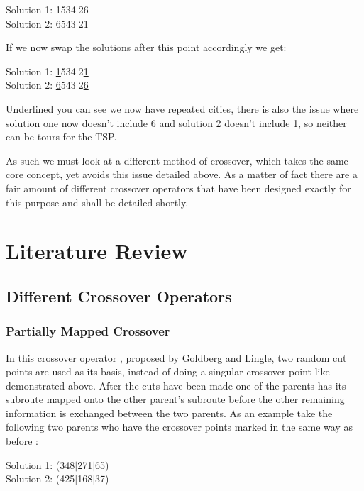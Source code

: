 \documentclass[11pt,a4paper,titlepage]{article}
\begin{document}
\begin{center}\Large
Solution 1: 1534$|$26\\
Solution 2: 6543$|$21
\end{center}

If we now swap the solutions after this point accordingly we get:

\begin{center}\Large
Solution 1: \underline{1}534$|$2\underline{1}\\
Solution 2: \underline{6}543$|$2\underline{6}
\end{center}

Underlined you can see we now have repeated cities, there is also the issue where solution one now doesn't include 6 and solution 2 doesn't include 1, so neither can be tours for the TSP.

As such we must look at a different method of crossover, which takes the same core concept, yet avoids this issue detailed above. As a matter of fact there are a fair amount of different crossover operators that have been designed exactly for this purpose and shall be detailed shortly.

\section{Literature Review}

\subsection{Different Crossover Operators}

\subsubsection{Partially Mapped Crossover}

In this crossover operator \cite{GACrossover}, proposed by Goldberg and Lingle, two random cut points are used as its basis, instead of doing a singular crossover point like demonstrated above. After the cuts have been made one of the parents has its subroute mapped onto the other parent's subroute before the other remaining information is exchanged between the two parents. As an example take the following two parents who have the crossover points marked in the same way as before \cite{GACrossover}:

\begin{center}\Large
Solution 1: (348$|$271$|$65)\\
Solution 2: (425$|$168$|$37)
\end{center}
\end{document}
